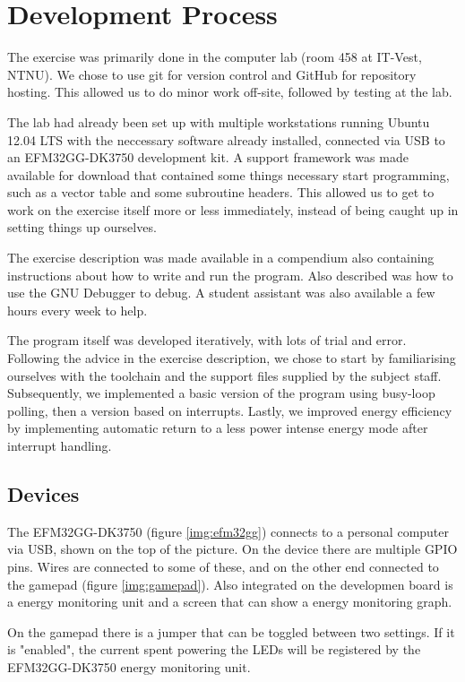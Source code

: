 \section{Development Process}
The exercise was primarily done in the computer lab (room 458 at IT-Vest, NTNU). We chose to use git for version control and GitHub for repository hosting. This allowed us to do minor work off-site, followed by testing at the lab.

The lab had already been set up with multiple workstations running Ubuntu 12.04 LTS with the neccessary software already installed, connected via USB to an EFM32GG-DK3750 development kit. A support framework was made available for download that contained some things necessary start programming, such as a vector table and some subroutine headers. This allowed us to get to work on the exercise itself more or less immediately, instead of being caught up in setting things up ourselves.

The exercise description was made available in a compendium also containing instructions about how to write and run the program. Also described was how to use the GNU Debugger to debug. A student assistant was also available a few hours every week to help.

The program itself was developed iteratively, with lots of trial and error. Following the advice in the exercise description, we chose to start by familiarising ourselves with the toolchain and the support files supplied by the subject staff. Subsequently, we implemented a basic version of the program using busy-loop polling, then a version based on interrupts. Lastly, we improved energy efficiency by implementing automatic return to a less power intense energy mode after interrupt handling.

\subsection{Devices}
The EFM32GG-DK3750 (figure \ref{img:efm32gg}) connects to a personal computer via USB, shown on the top of the picture. On the device there are multiple GPIO pins. Wires are connected to some of these, and on the other end connected to the gamepad (figure \ref{img:gamepad}). Also integrated on the developmen board is a energy monitoring unit and a screen that can show a energy monitoring graph.

On the gamepad there is a jumper that can be toggled between two settings. If it is "enabled", the current spent powering the LEDs will be registered by the EFM32GG-DK3750 energy monitoring unit.

